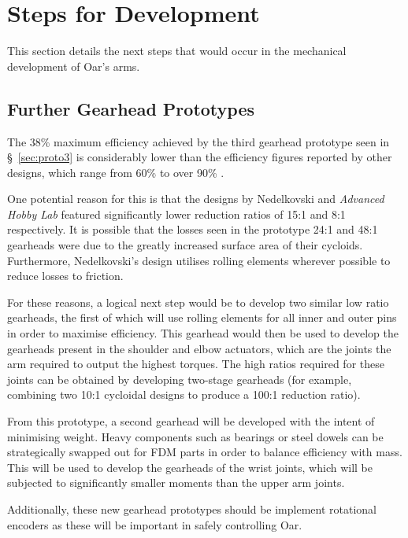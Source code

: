 \documentclass[a4paper,11pt]{article}
\begin{document}
\newpage
\section{Steps for Development}\label{sec:development}

This section details the next steps that would occur in the mechanical development of Oar's arms.

\subsection{Further Gearhead Prototypes}

The 38\% maximum efficiency achieved by the third gearhead prototype seen in \S~\ref{sec:proto3} is considerably lower than the efficiency figures reported by other designs, which range from 60\% \cite{nedelkovski2022} to over 90\% \cite{ahl2026}.

One potential reason for this is that the designs by Nedelkovski \cite{nedelkovski2022} and \textit{Advanced Hobby Lab} \cite{ahl2026} featured significantly lower reduction ratios of 15:1 and 8:1 respectively. It is possible that the losses seen in the prototype 24:1 and 48:1 gearheads were due to the greatly increased surface area of their cycloids. Furthermore, Nedelkovski's design utilises rolling elements wherever possible to reduce losses to friction.

For these reasons, a logical next step would be to develop two similar low ratio gearheads, the first of which will use rolling elements for all inner and outer pins in order to maximise efficiency. This gearhead would then be used to develop the gearheads present in the shoulder and elbow actuators, which are the joints the arm required to output the highest torques. The high ratios required for these joints can be obtained by developing two-stage gearheads (for example, combining two 10:1 cycloidal designs to produce a 100:1 reduction ratio).

From this prototype, a second gearhead will be developed with the intent of minimising weight. Heavy components such as bearings or steel dowels can be strategically swapped out for FDM parts in order to balance efficiency with mass. This will be used to develop the gearheads of the wrist joints, which will be subjected to significantly smaller moments than the upper arm joints.

Additionally, these new gearhead prototypes should be implement rotational encoders as these will be important in safely controlling Oar.
\end{document}
